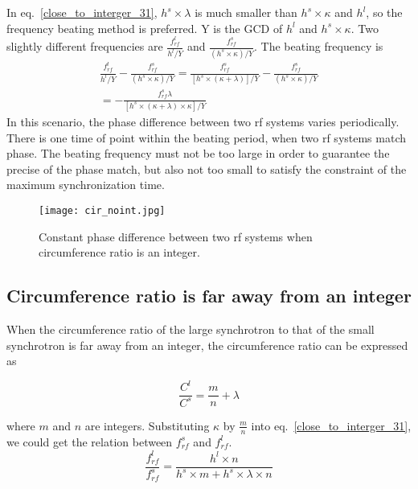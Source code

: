 In eq.~\ref{close_to_interger_31}, $h^s\times\lambda $ is much smaller than $h^s \times \kappa$ and $h^l$, so the frequency beating method is preferred. Y is the GCD of $h^l$ and $h^s \times \kappa$. Two slightly different frequencies are $\frac{f_{\mathit{rf}}^{l}}{h^l/Y}$ and $\frac{f_{\mathit{rf}}^{s}}{(h^s\times \kappa)/Y}$. The beating frequency is
\begin{equation} 
\begin{split}
\frac{f_{\mathit{rf}}^{l}}{h^l/Y}-\frac{f_{\mathit{rf}}^{s}}{(h^s\times \kappa)/Y}=\frac{f_{\mathit{rf}}^{s}}{[h^s\times (\kappa+\lambda)]/Y}-\frac{f_{\mathit{rf}}^{s}}{(h^s\times \kappa)/Y}\\=-\frac{f_{\mathit{rf}}^{s}\lambda}{[h^s\times (\kappa+\lambda)\times \kappa]/Y}
\end{split}
\end{equation}
In this scenario, the phase difference between two rf systems varies periodically. There is one time of point within the beating period, when two rf systems match phase. The beating frequency must not be too large in order to guarantee the precise of the phase match, but also not too small to satisfy the constraint of the maximum synchronization time. 
\begin{figure}[!htb]
   \centering   
   \texttt{[image: cir\_noint.jpg]}
   \caption{Constant phase difference between two rf systems when circumference ratio is an integer.}
   \label{cir_noint}
\end{figure} 


\subsection{Circumference ratio is far away from an integer}
When the circumference ratio of the large synchrotron to that of the small synchrotron is far away from an integer, the circumference ratio can be expressed as

\begin{equation}
\frac{C^l}{C^s}=\frac{m}{n}+ \lambda \label{circumference_ratio_noint11}
\end{equation}

where $m$ and $n$ are integers. Substituting $\kappa$ by $\frac{m}{n}$ into eq.~\ref{close_to_interger_31}, we could get the relation between $f_{\mathit{rf}}^{s}$ and $f_{\mathit{rf}}^{l}$.
\begin{equation} 
\frac{f_{\mathit{rf}}^{l}}{f_{\mathit{rf}}^{s}}=\frac{h^l\times n}{h^s \times m+ h^s \times\lambda\times n}\label{close_to_interger11}
\end{equation}


